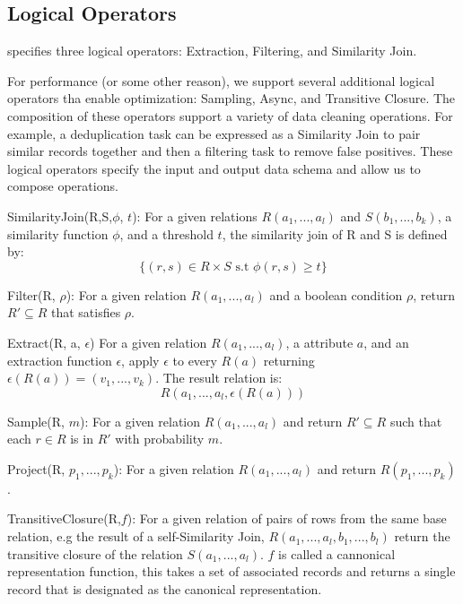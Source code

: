 \subsection{Logical Operators}
\projx specifies three logical operators: Extraction, Filtering, and Similarity Join. 

For performance (or some other reason), we support several additional
logical operators tha enable optimization: Sampling, Async, and Transitive Closure.
The composition of these operators support a variety of data cleaning
operations. 
For example, a deduplication task can be expressed as a Similarity Join to pair similar records
together and then a filtering task to remove false positives.
These logical operators specify the input and output data schema and allow us to compose operations.


\vspace{0.5em}

\noindent \textsf{SimilarityJoin(R,S,$\phi$, $t$)}: For a given relations $R(a_1,...,a_l)$ and $S(b_1,...,b_k)$, a similarity function $\phi$, and a threshold $t$, the similarity join of R and S is defined by:
\[
\{ (r,s) \in R \times S \text{ s.t } \phi (r,s) \ge t \}
\]

\vspace{0.5em}


\noindent \textsf{Filter(R, $\rho$)}: For a given relation $R(a_1,...,a_l)$ and a boolean condition $\rho$, return $R' \subseteq R$ that satisfies $\rho$.

\vspace{0.5em}

\noindent \textsf{Extract(R, a, $\epsilon$)} For a given relation $R(a_1,...,a_l)$, a attribute $a$, and an extraction function $\epsilon$, apply $\epsilon$ to every $R(a)$ returning $\epsilon(R(a)) = (v_1,...,v_k)$. The result relation is:
\[
R(a_1,...,a_l,\epsilon(R(a)))
\]

\noindent \textsf{Sample(R, $m$)}: For a given relation $R(a_1,...,a_l)$ and return $R' \subseteq R$ such that each $r \in R$ is in $R'$ with probability $m$.

\vspace{0.5em}

\noindent \textsf{Project(R, $p_1,...,p_k$)}: For a given relation $R(a_1,...,a_l)$ and return $R(p_1,...,p_k)$.

\vspace{0.5em}

\noindent \textsf{TransitiveClosure(R,$f$)}: For a given relation of pairs of rows from the same base relation, e.g the result of a self-Similarity Join, $R(a_1,...,a_l, b_1,...,b_l)$ return the transitive closure of the relation $S(a_1,...,a_l)$. $f$ is called a cannonical representation function, this takes a set of associated records and returns a single record that is designated as the canonical representation.






